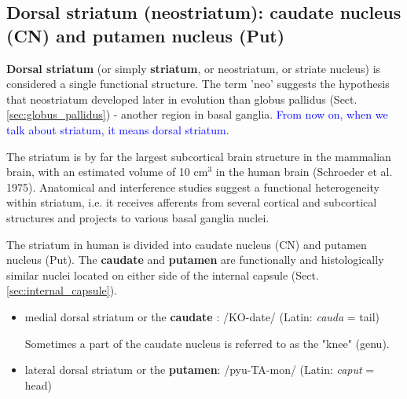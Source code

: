 \subsection{Dorsal striatum (neostriatum): caudate nucleus (CN) and putamen
nucleus (Put)}
\label{sec:dorsal-striatum}
\label{sec:caudate}
\label{sec:putamen}
\label{sec:neostriatum}


{\bf Dorsal striatum} (or simply {\bf striatum}, or neostriatum, or striate
nucleus) is considered a single functional structure. The term 'neo' suggests
the hypothesis that neostriatum developed later in evolution than globus
pallidus (Sect.\ref{sec:globus_pallidus}) - another region in basal ganglia.
\textcolor{blue}{From now on, when we talk about striatum, it
means dorsal striatum}. 

The striatum is by far the largest subcortical brain structure in the mammalian
brain, with an estimated volume of 10 cm$^3$ in the human brain (Schroeder et
al. 1975). Anatomical and interference studies suggest a functional
heterogeneity within striatum, i.e. it receives afferents from several cortical
and subcortical structures and projects to various basal ganglia nuclei.

The striatum in human is divided into caudate nucleus (CN) and putamen nucleus
(Put). The {\bf caudate}  and {\bf putamen} are functionally and
histologically similar nuclei located on either side of the internal capsule
(Sect.\ref{sec:internal_capsule}).

\begin{itemize}
  \item medial dorsal striatum or the {\bf caudate} : /KO-date/ (Latin: {\it
  cauda} = tail)

Sometimes a part of the caudate nucleus is referred to as the "knee" (genu).
  
  \item lateral dorsal striatum or the {\bf putamen}: /pyu-TA-mon/ (Latin: {\it
  caput} = head) 
\end{itemize}

